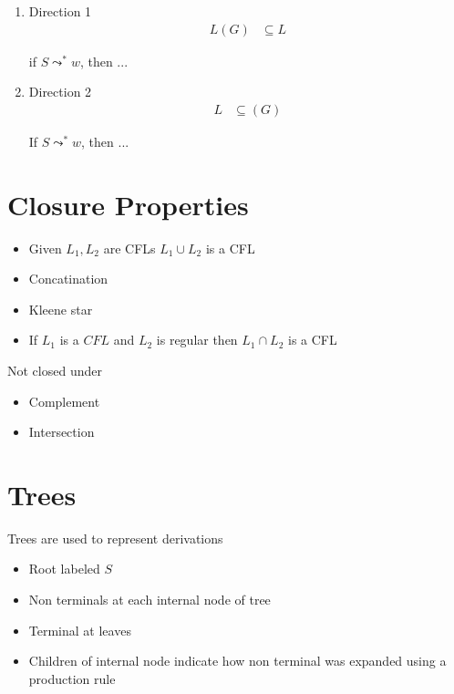   \begin{enumerate}
    \item Direction 1
    \begin{align*}
      L \left( G \right) &\subseteq L
    \end{align*}

    if $ S \leadsto^{*} w $, then ...

    \item Direction 2
    \begin{align*}
      L &\subseteq \left( G \right)
    \end{align*}

    If $ S \leadsto^{*} w $, then ...
  \end{enumerate}

\section{Closure Properties}

  \begin{itemize}
    \item Given $ L_{1}, L_{2} $ are CFLs $ L_{1} \cup L_{2} $ is a CFL
    \item Concatination
    \item Kleene star
    \item If $ L_{1} $ is a $ CFL $ and $ L_{2} $ is regular then
    $ L_{1} \cap L_{2} $ is a CFL
  \end{itemize}

  Not closed under

  \begin{itemize}
    \item Complement
    \item Intersection
  \end{itemize}

\section{Trees}

  Trees are used to represent derivations

  \begin{itemize}
    \item Root labeled $ S $
    \item Non terminals at each internal node of tree
    \item Terminal at leaves
    \item Children of internal node indicate how non terminal was expanded
    using a production rule
  \end{itemize}

